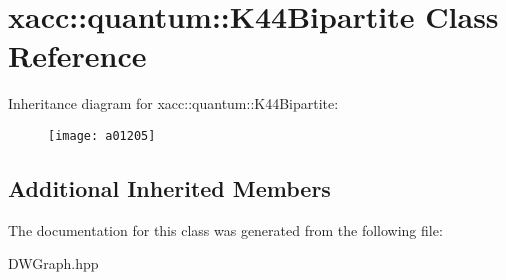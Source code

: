 \hypertarget{a01205}{}\section{xacc\+:\+:quantum\+:\+:K44\+Bipartite Class Reference}
\label{a01205}
Inheritance diagram for xacc\+:\+:quantum\+:\+:K44\+Bipartite\+:\begin{figure}[H]
\begin{center}
\leavevmode
\texttt{[image: a01205]}
\end{center}
\end{figure}
\subsection*{Additional Inherited Members}


The documentation for this class was generated from the following file\+:\begin{DoxyCompactItemize}
\item 
D\+W\+Graph.\+hpp\end{DoxyCompactItemize}
